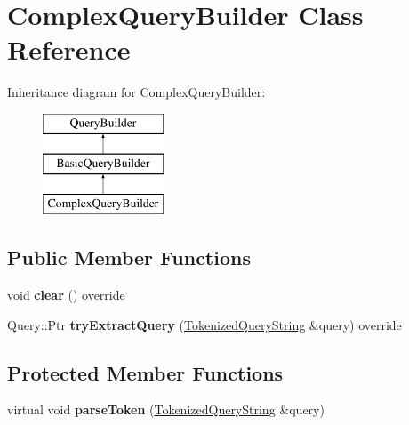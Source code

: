 \hypertarget{class_complex_query_builder}{}\section{Complex\+Query\+Builder Class Reference}
\label{class_complex_query_builder}
Inheritance diagram for Complex\+Query\+Builder\+:\begin{figure}[H]
\begin{center}
\leavevmode
\includegraphics[height=3.000000cm]{class_complex_query_builder}
\end{center}
\end{figure}
\subsection*{Public Member Functions}
\begin{DoxyCompactItemize}
\item 
\mbox{\label{class_complex_query_builder_aaf3f971daf43452502fc6fed296494e9}} 
void {\bfseries clear} () override
\item 
\mbox{\label{class_complex_query_builder_aab521c81b6ecb9bc4466a61cdf9ccfed}} 
Query\+::\+Ptr {\bfseries try\+Extract\+Query} (\hyperlink{struct_tokenized_query_string}{Tokenized\+Query\+String} \&query) override
\end{DoxyCompactItemize}
\subsection*{Protected Member Functions}
\begin{DoxyCompactItemize}
\item 
\mbox{\label{class_complex_query_builder_a1169df1b39a76c283bea1f0f7ec601d9}} 
virtual void {\bfseries parse\+Token} (\hyperlink{struct_tokenized_query_string}{Tokenized\+Query\+String} \&query)
\end{DoxyCompactItemize}
